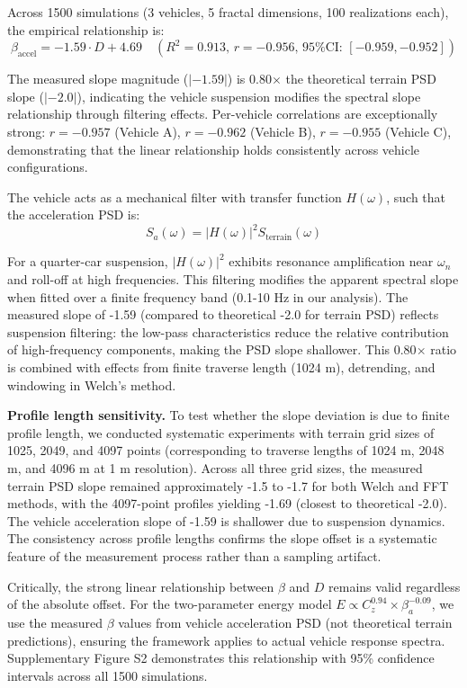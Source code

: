 \documentclass[11pt,letterpaper]{article}
\begin{document}
Across 1500 simulations (3 vehicles, 5 fractal dimensions, 100 realizations each), the empirical relationship is:
\begin{equation}
\beta_{\text{accel}} = -1.59 \cdot D + 4.69 \quad (R^2 = 0.913, \, r = -0.956, \, \text{95\% CI: } [-0.959, -0.952])
\end{equation}

The measured slope magnitude ($|-1.59|$) is 0.80$\times$ the theoretical terrain PSD slope ($|-2.0|$), indicating the vehicle suspension modifies the spectral slope relationship through filtering effects. Per-vehicle correlations are exceptionally strong: $r = -0.957$ (Vehicle A), $r = -0.962$ (Vehicle B), $r = -0.955$ (Vehicle C), demonstrating that the linear relationship holds consistently across vehicle configurations.

The vehicle acts as a mechanical filter with transfer function $H(\omega)$, such that the acceleration PSD is:
\begin{equation}
S_a(\omega) = |H(\omega)|^2 S_{\text{terrain}}(\omega)
\end{equation}

For a quarter-car suspension, $|H(\omega)|^2$ exhibits resonance amplification near $\omega_n$ and roll-off at high frequencies. This filtering modifies the apparent spectral slope when fitted over a finite frequency band (0.1-10 Hz in our analysis). The measured slope of -1.59 (compared to theoretical -2.0 for terrain PSD) reflects suspension filtering: the low-pass characteristics reduce the relative contribution of high-frequency components, making the PSD slope shallower. This 0.80$\times$ ratio is combined with effects from finite traverse length (1024 m), detrending, and windowing in Welch's method.

\textbf{Profile length sensitivity.} To test whether the slope deviation is due to finite profile length, we conducted systematic experiments with terrain grid sizes of 1025, 2049, and 4097 points (corresponding to traverse lengths of 1024 m, 2048 m, and 4096 m at 1 m resolution). Across all three grid sizes, the measured terrain PSD slope remained approximately -1.5 to -1.7 for both Welch and FFT methods, with the 4097-point profiles yielding -1.69 (closest to theoretical -2.0). The vehicle acceleration slope of -1.59 is shallower due to suspension dynamics. The consistency across profile lengths confirms the slope offset is a systematic feature of the measurement process rather than a sampling artifact.

Critically, the strong linear relationship between $\beta$ and $D$ remains valid regardless of the absolute offset. For the two-parameter energy model $E \propto C_z^{0.94} \times \beta_a^{-0.09}$, we use the measured $\beta$ values from vehicle acceleration PSD (not theoretical terrain predictions), ensuring the framework applies to actual vehicle response spectra. Supplementary Figure S2 demonstrates this relationship with 95\% confidence intervals across all 1500 simulations.
\end{document}
